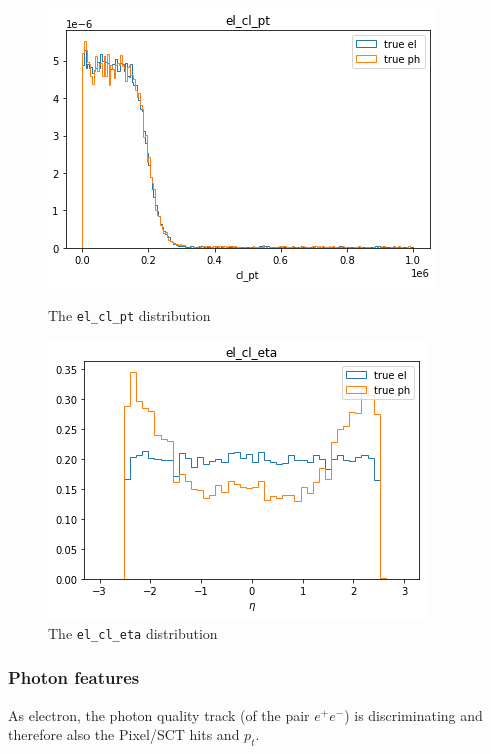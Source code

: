 \documentclass[a4paper, oneside]{book}
\begin{document}
\begin{figure}[ht]
\begin{minipage}[b]{0.5\linewidth}
							\includegraphics[width=.9\linewidth]{tesi_images/el_cl_pt.png} 
							\caption{The \texttt{el\_cl\_pt} distribution} 
							\label{fig: pt}
							\vspace{4ex}
						\end{minipage}%
						\begin{minipage}[b]{0.5\linewidth}
							\centering
							\includegraphics[width=.9\linewidth]{tesi_images/el_cl_eta.png} 
							\caption{The \texttt{el\_cl\_eta} distribution} 
							\label{fig: eta}
							\vspace{4ex}
						\end{minipage} 
					\end{figure}
				
				
				\subsubsection{Photon features}
					As electron, the photon quality track (of the pair $e^{+}e^{-}$) is discriminating and therefore also the Pixel/SCT hits and $p_t$.
					
\end{document}
